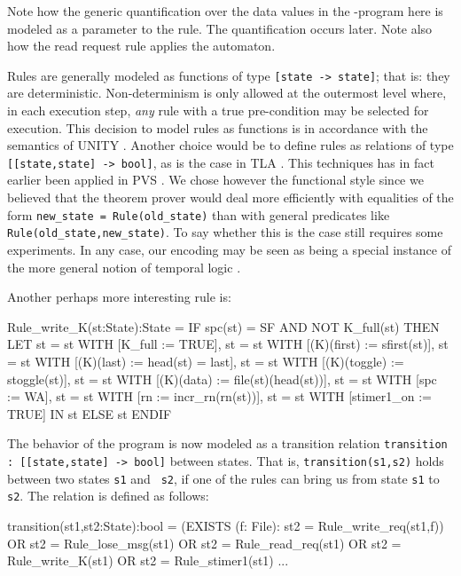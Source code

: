 Note  how  the  generic quantification  over  the data values  in  the
\Murphi{}-program  here is  modeled as a  parameter to  the rule. The
quantification occurs later. Note also how the read request rule applies
the automaton. 

Rules are    generally modeled as  functions of   type {\tt  [state ->
state]};  that  is: they are  deterministic.   Non-determinism is only
allowed  at the  outermost level where,  in  each execution step, {\em
any}  rule with a  true pre-condition  may be  selected for execution.
This decision to  model rules as functions  is in  accordance with the
semantics of UNITY \cite{CM:UNITY}.  Another choice would be to define
rules as relations of  type {\tt [[state,state] ->  bool]}, as  is the
case in TLA \cite{TLA:TOPLAS94}.  This  techniques has in fact earlier been
applied in  PVS   \cite{Sha:PVS.Real-Time}.   We chose    however  the
functional style since we believed  that the theorem prover would deal
more  efficiently  with  equalities   of the form  {\tt   new\_state =
Rule(old\_state)}    than    with   general    predicates  like   {\tt
Rule(old\_state,new\_state)}.  To  say whether this  is the case still
requires some experiments.  In  any case, our  encoding may be seen as
being a special instance of the more general notion of temporal logic
\cite{Eme:Temp.Logic}.

\noindent Another perhaps more interesting rule is:

\begin{smallsession}
  Rule_write_K(st:State):State =
    IF spc(st) = SF AND NOT K_full(st) THEN 
      LET 
        st = st WITH [K_full := TRUE],
        st = st WITH [(K)(first) := sfirst(st)],
        st = st WITH [(K)(last) := head(st) = last],
        st = st WITH [(K)(toggle) := stoggle(st)],
        st = st WITH [(K)(data) := file(st)(head(st))],
        st = st WITH [spc := WA],
        st = st WITH [rn := incr_rn(rn(st))],
        st = st WITH [stimer1_on := TRUE]
      IN st
    ELSE  
      st
    ENDIF
\end{smallsession}

The behavior of the program is now  modeled as a transition relation
{\tt transition  : [[state,state] -> bool]} between  states. That  is,
{\tt transition(s1,s2)} holds between two  states  {\tt s1}  and  {\tt
s2}, if one of the rules can bring us from state {\tt s1} to {\tt s2}.
The relation is defined as follows:

\begin{smallsession}
  transition(st1,st2:State):bool =
    (EXISTS (f: File): 
       st2 = Rule_write_req(st1,f))
    OR st2 = Rule_lose_msg(st1)
    OR st2 = Rule_read_req(st1)
    OR st2 = Rule_write_K(st1)
    OR st2 = Rule_stimer1(st1)
    ...
\end{smallsession}

